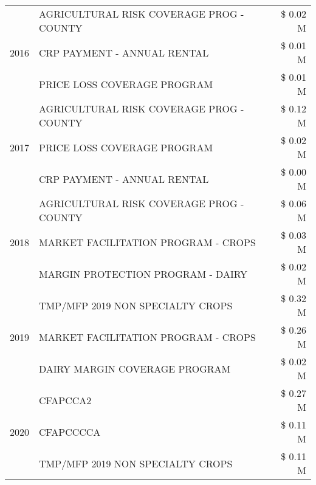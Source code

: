 \begin{tabular}{llr}
\cline{1-3}
\multirow[t]{3}{*}{2016} & AGRICULTURAL RISK COVERAGE PROG - COUNTY & \$ 0.02 M \\
 & CRP PAYMENT - ANNUAL RENTAL & \$ 0.01 M \\
 & PRICE LOSS COVERAGE PROGRAM & \$ 0.01 M \\
\cline{1-3}
\multirow[t]{3}{*}{2017} & AGRICULTURAL RISK COVERAGE PROG - COUNTY & \$ 0.12 M \\
 & PRICE LOSS COVERAGE PROGRAM & \$ 0.02 M \\
 & CRP PAYMENT - ANNUAL RENTAL & \$ 0.00 M \\
\cline{1-3}
\multirow[t]{3}{*}{2018} & AGRICULTURAL RISK COVERAGE PROG - COUNTY & \$ 0.06 M \\
 & MARKET FACILITATION PROGRAM - CROPS & \$ 0.03 M \\
 & MARGIN PROTECTION PROGRAM - DAIRY & \$ 0.02 M \\
\cline{1-3}
\multirow[t]{3}{*}{2019} & TMP/MFP 2019 NON SPECIALTY CROPS & \$ 0.32 M \\
 & MARKET FACILITATION PROGRAM - CROPS & \$ 0.26 M \\
 & DAIRY MARGIN COVERAGE PROGRAM & \$ 0.02 M \\
\cline{1-3}
\multirow[t]{3}{*}{2020} & CFAPCCA2 & \$ 0.27 M \\
 & CFAPCCCCA & \$ 0.11 M \\
 & TMP/MFP 2019 NON SPECIALTY CROPS & \$ 0.11 M \\
\cline{1-3}
\bottomrule
\end{tabular}
